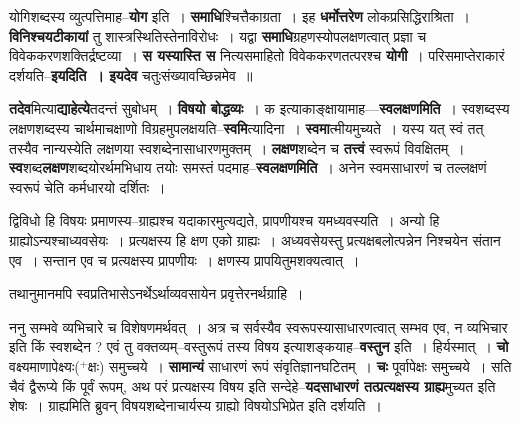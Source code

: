 \documentclass[article,12pt,a4paper]{memoir}
\newcommand{\add}[1]{($^{+}$#1)}
\begin{document}
	  \pstart योगिशब्दस्य व्युत्पत्तिमाह--\textbf{योग} इति । \textbf{समाधि}श्चित्तैकाग्रता । इह \textbf{धर्मोत्तरेण} लोकप्रसिद्धिराश्रिता । \textbf{विनिश्चयटीकायां} तु शास्त्रस्थितिस्तेनाविरोधः । यद्वा \textbf{समाधि}ग्रहणस्योपलक्षणत्वात् प्रज्ञा च विवेककरणशक्तिर्द्रष्टव्या । \textbf{स यस्यास्ति स} नित्यसमाहितो विवेककरणतत्परश्च \textbf{योगी} । परिसमाप्तेराकारं दर्शयति--\textbf{इयदिति । इयदेव} चतुःसंख्यावच्छिन्नमेव ॥
	\pend
      

	  \pstart \textbf{तदेव}मित्या\textbf{द्याहेत्ये}तदन्तं सुबोधम् । \textbf{विषयो बोद्धव्यः} । क इत्याकाङ्क्षायामाह—\textbf{स्वलक्षणमिति} । स्वशब्दस्य लक्षणशब्दस्य चार्थमाचक्षाणो विग्रहमुपलक्षयति--\textbf{स्वमि}त्यादिना । \textbf{स्वमा}त्मीयमुच्यते । यस्य यत् स्वं तत् तस्यैव नान्यस्येति लक्षणया स्वशब्देनासाधारणमुक्तम् । \textbf{लक्षण}शब्देन च \textbf{तत्त्वं} स्वरूपं विवक्षितम् । \textbf{स्व}शब्द\textbf{लक्षण}शब्दयोरर्थमभिधाय तयोः समस्तं पदमाह--\textbf{स्वलक्षणमिति} । अनेन स्वमसाधारणं च तल्लक्षणं स्वरूपं चेति कर्मधारयो दर्शितः ।
	\pend
	  \bigskip
	  \begingroup
	

	  \pstart द्विविधो हि विषयः प्रमाणस्य--ग्राह्यश्च यदाकारमुत्यद्यते, प्रापणीयश्च यमध्यवस्यति । अन्यो हि ग्राह्योऽन्यश्चाध्यवसेयः । प्रत्यक्षस्य हि क्षण एको ग्राह्यः । अध्यवसेयस्तु प्रत्यक्षबलोत्पन्नेन निश्चयेन संतान एव । सन्तान एव च प्रत्यक्षस्य प्रापणीयः । क्षणस्य प्रापयितुमशक्यत्वात् ।
	\pend
        

	  \pstart तथानुमानमपि स्वप्रतिभासेऽनर्थेऽर्थाव्यवसायेन प्रवृत्तेरनर्थग्राहि ।
	\pend
      
	  \endgroup
	

	  \pstart ननु सम्भवे व्यभिचारे च विशेषणमर्थवत् । अत्र च सर्वस्यैव स्वरूपस्यासाधारणत्वात् सम्भव एव, न व्यभिचार इति किं स्वशब्देन ? एवं तु वक्तव्यम्--वस्तुरूपं तस्य विषय इत्याशङ्कयाह--\textbf{वस्तुन} इति । हिर्यस्मात् । \textbf{चो} वक्ष्यमाणापेक्ष्यः\add{क्षः} समुच्चये । \textbf{सामान्यं} साधारणं रूपं संवृतिज्ञानघटितम् । \textbf{चः} पूर्वापेक्षः समुच्चये । सति चैवं द्वैरूप्ये किं पूर्वं रूपम्, अथ परं प्रत्यक्षस्य विषय इति सन्देहे--\textbf{यदसाधारणं तत्प्रत्यक्षस्य ग्राह्य}मुच्यत इति शेषः । ग्राह्यमिति ब्रुवन् विषयशब्देनाचार्यस्य ग्राह्यो विषयोऽभिप्रेत इति दर्शयति ।
	\pend
      
\end{document}
